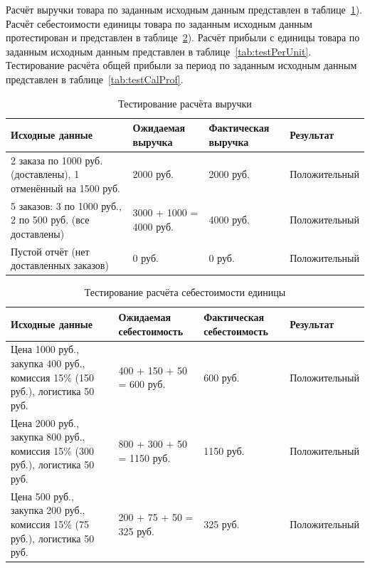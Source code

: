 Расчёт выручки товара по заданным исходным данным представлен в таблице~\ref{tab:testEquation}). Расчёт себестоимости единицы товара по заданным исходным данным протестирован и представлен в таблице~\ref{tab:testCostOfProduction}). Расчёт прибыли с единицы товара по заданным исходным данным представлен в таблице~\ref{tab:testPerUnit}. Тестирование расчёта общей прибыли за период по заданным исходным данным представлен в таблице~\ref{tab:testCalProf}.
\begin{table}[!htb]
\caption{\label{tab:testEquation}Тестирование расчёта выручки}
\small
\begin{center}
\vspace{-0.5cm}\begin{tabular}{|p{4cm}|p{3cm}|p{3cm}|p{4cm}|}
\hline
Исходные данные & Ожидаемая выручка & Фактическая выручка & Результат \\ \hline
2 заказа по 1000 руб. (доставлены), 1 отменённый на 1500 руб. & 2000 руб. & 2000 руб. & Положительный \\ \hline
5 заказов: 3 по 1000 руб., 2 по 500 руб. (все доставлены) & 3000 + 1000 = 4000 руб. & 4000 руб. & Положительный \\ \hline
Пустой отчёт (нет доставленных заказов) & 0 руб. & 0 руб. & Положительный \\ \hline
\end{tabular}
\end{center}
\end{table}

\begin{table}[!htb]
\caption{\label{tab:testCostOfProduction}Тестирование расчёта себестоимости единицы}
\small
\begin{center}
\vspace{-0.5cm}\begin{tabular}{|p{5cm}|p{3cm}|p{3cm}|p{4cm}|}
\hline
Исходные данные & Ожидаемая себестоимость & Фактическая себестоимость & Результат \\ \hline
Цена 1000 руб., закупка 400 руб., комиссия 15\% (150 руб.), логистика 50 руб. & 400 + 150 + 50 = 600 руб. & 600 руб. & Положительный \\ \hline
Цена 2000 руб., закупка 800 руб., комиссия 15\% (300 руб.), логистика 50 руб. & 800 + 300 + 50 = 1150 руб. & 1150 руб. & Положительный \\ \hline
Цена 500 руб., закупка 200 руб., комиссия 15\% (75 руб.), логистика 50 руб. & 200 + 75 + 50 = 325 руб. & 325 руб. & Положительный \\ \hline
\end{tabular}
\end{center}
\end{table}

